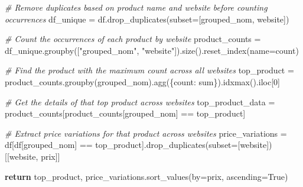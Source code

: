 \documentclass[
]{article}
\newenvironment{Shaded}{}{}
\newcommand{\CommentTok}[1]{\textcolor[rgb]{0.38,0.63,0.69}{\textit{#1}}}
\newcommand{\ControlFlowTok}[1]{\textcolor[rgb]{0.00,0.44,0.13}{\textbf{#1}}}
\newcommand{\DecValTok}[1]{\textcolor[rgb]{0.25,0.63,0.44}{#1}}
\newcommand{\NormalTok}[1]{#1}
\newcommand{\OperatorTok}[1]{\textcolor[rgb]{0.40,0.40,0.40}{#1}}
\newcommand{\StringTok}[1]{\textcolor[rgb]{0.25,0.44,0.63}{#1}}
\newcommand{\VariableTok}[1]{\textcolor[rgb]{0.10,0.09,0.49}{#1}}
\begin{document}
\begin{Shaded}
\begin{Highlighting}[]
    \CommentTok{\# Remove duplicates based on product name and website before counting occurrences}
\NormalTok{    df\_unique }\OperatorTok{=}\NormalTok{ df.drop\_duplicates(subset}\OperatorTok{=}\NormalTok{[}\StringTok{\textquotesingle{}grouped\_nom\textquotesingle{}}\NormalTok{, }\StringTok{\textquotesingle{}website\textquotesingle{}}\NormalTok{])}
    
    \CommentTok{\# Count the occurrences of each product by website}
\NormalTok{    product\_counts }\OperatorTok{=}\NormalTok{ df\_unique.groupby([}\StringTok{"grouped\_nom"}\NormalTok{, }\StringTok{"website"}\NormalTok{]).size().reset\_index(name}\OperatorTok{=}\StringTok{\textquotesingle{}count\textquotesingle{}}\NormalTok{)}
    
    \CommentTok{\# Find the product with the maximum count across all websites}
\NormalTok{    top\_product }\OperatorTok{=}\NormalTok{ product\_counts.groupby(}\StringTok{\textquotesingle{}grouped\_nom\textquotesingle{}}\NormalTok{).agg(\{}\StringTok{\textquotesingle{}count\textquotesingle{}}\NormalTok{: }\StringTok{\textquotesingle{}sum\textquotesingle{}}\NormalTok{\}).idxmax().iloc[}\DecValTok{0}\NormalTok{]}

    \CommentTok{\# Get the details of that top product across websites}
\NormalTok{    top\_product\_data }\OperatorTok{=}\NormalTok{ product\_counts[product\_counts[}\StringTok{\textquotesingle{}grouped\_nom\textquotesingle{}}\NormalTok{] }\OperatorTok{==}\NormalTok{ top\_product]}
    
    \CommentTok{\# Extract price variations for that product across websites}
\NormalTok{    price\_variations }\OperatorTok{=}\NormalTok{ df[df[}\StringTok{\textquotesingle{}grouped\_nom\textquotesingle{}}\NormalTok{] }\OperatorTok{==}\NormalTok{ top\_product].drop\_duplicates(subset}\OperatorTok{=}\NormalTok{[}\StringTok{\textquotesingle{}website\textquotesingle{}}\NormalTok{])[[}\StringTok{\textquotesingle{}website\textquotesingle{}}\NormalTok{, }\StringTok{\textquotesingle{}prix\textquotesingle{}}\NormalTok{]]}

    \ControlFlowTok{return}\NormalTok{ top\_product, price\_variations.sort\_values(by}\OperatorTok{=}\StringTok{\textquotesingle{}prix\textquotesingle{}}\NormalTok{, ascending}\OperatorTok{=}\VariableTok{True}\NormalTok{)}
\end{Highlighting}
\end{Shaded}
\end{document}

